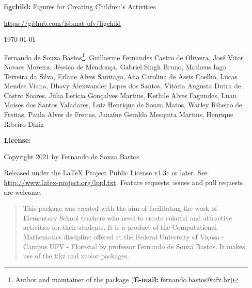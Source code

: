 \documentclass[x11names]{article}
\begin{document}


\thispagestyle{empty}

\begin{center}

\textbf{figchild:} Figures for Creating Children's Activities

\vspace{0.5cm}

\url{https://github.com/fsbmat-ufv/figchild}

\vspace{0.5cm}


\vspace{0.5cm}

\today

\end{center}

\vspace{2cm}



 Fernando de Souza Bastos\footnote{Author and maintainer of the package (\textbf{E-mail:} fernando.bastos@ufv.br)}, 
 Guilherme Fernandes Castro de Oliveira, 
 José Vitor Novaes Moreira,
 Jéssica de Mendonça,
 Gabriel Singh Bruno,
 Matheus Iago Teixeira da Silva,
 Erlane Alves Santiago,
 Ana Carolina de Assis Coelho,
 Lucas Mendes Viana,
 Dhavy Alexwander Lopes dos Santos,
 Vitória Augusta Dutra de Castro Soares,
 Júlia Letícia Gonçalves Martins,
 Kethile Alves Fagundes,
 Luan Moises dos Santos Valadares,
 Luiz Henrique de Souza Matos,
 Warley Ribeiro de Freitas,
 Paula Alves de Freitas,
 Janaíne Geralda Mesquita Martins,
 Henrique Ribeiro Diniz
 
\vspace{3cm}

\noindent \textbf{License:}

\vspace{1cm}

\noindent Copyright 2021 by Fernando de Souza Bastos

\vspace{1cm}

\noindent Released under the LaTeX Project Public License v1.3c or later. See \url{http://www.latex-project.org/lppl.txt}. Feature requests, issues and pull requests are welcome.

\newpage

\begin{abstract}
This package was created with the aim of facilitating the work of Elementary School teachers who need to create colorful and attractive activities for their students. It is a product of the Computational Mathematics discipline offered at the Federal University of Viçosa - Campus UFV - Florestal by professor Fernando de Souza Bastos. It makes use of the tikz and xcolor packages.
\end{abstract}
\end{document}
